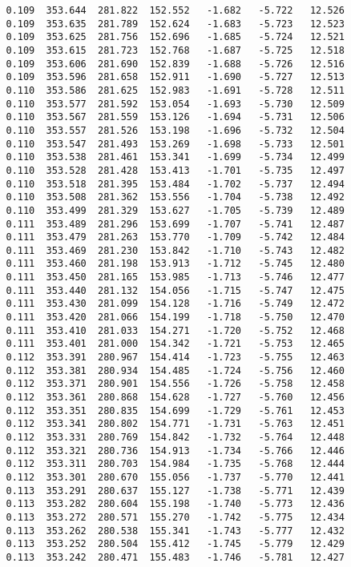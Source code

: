 \begin{verbatim}
   0.109  353.644  281.822  152.552   -1.682   -5.722   12.526
   0.109  353.635  281.789  152.624   -1.683   -5.723   12.523
   0.109  353.625  281.756  152.696   -1.685   -5.724   12.521
   0.109  353.615  281.723  152.768   -1.687   -5.725   12.518
   0.109  353.606  281.690  152.839   -1.688   -5.726   12.516
   0.109  353.596  281.658  152.911   -1.690   -5.727   12.513
   0.110  353.586  281.625  152.983   -1.691   -5.728   12.511
   0.110  353.577  281.592  153.054   -1.693   -5.730   12.509
   0.110  353.567  281.559  153.126   -1.694   -5.731   12.506
   0.110  353.557  281.526  153.198   -1.696   -5.732   12.504
   0.110  353.547  281.493  153.269   -1.698   -5.733   12.501
   0.110  353.538  281.461  153.341   -1.699   -5.734   12.499
   0.110  353.528  281.428  153.413   -1.701   -5.735   12.497
   0.110  353.518  281.395  153.484   -1.702   -5.737   12.494
   0.110  353.508  281.362  153.556   -1.704   -5.738   12.492
   0.110  353.499  281.329  153.627   -1.705   -5.739   12.489
   0.111  353.489  281.296  153.699   -1.707   -5.741   12.487
   0.111  353.479  281.263  153.770   -1.709   -5.742   12.484
   0.111  353.469  281.230  153.842   -1.710   -5.743   12.482
   0.111  353.460  281.198  153.913   -1.712   -5.745   12.480
   0.111  353.450  281.165  153.985   -1.713   -5.746   12.477
   0.111  353.440  281.132  154.056   -1.715   -5.747   12.475
   0.111  353.430  281.099  154.128   -1.716   -5.749   12.472
   0.111  353.420  281.066  154.199   -1.718   -5.750   12.470
   0.111  353.410  281.033  154.271   -1.720   -5.752   12.468
   0.111  353.401  281.000  154.342   -1.721   -5.753   12.465
   0.112  353.391  280.967  154.414   -1.723   -5.755   12.463
   0.112  353.381  280.934  154.485   -1.724   -5.756   12.460
   0.112  353.371  280.901  154.556   -1.726   -5.758   12.458
   0.112  353.361  280.868  154.628   -1.727   -5.760   12.456
   0.112  353.351  280.835  154.699   -1.729   -5.761   12.453
   0.112  353.341  280.802  154.771   -1.731   -5.763   12.451
   0.112  353.331  280.769  154.842   -1.732   -5.764   12.448
   0.112  353.321  280.736  154.913   -1.734   -5.766   12.446
   0.112  353.311  280.703  154.984   -1.735   -5.768   12.444
   0.112  353.301  280.670  155.056   -1.737   -5.770   12.441
   0.113  353.291  280.637  155.127   -1.738   -5.771   12.439
   0.113  353.282  280.604  155.198   -1.740   -5.773   12.436
   0.113  353.272  280.571  155.270   -1.742   -5.775   12.434
   0.113  353.262  280.538  155.341   -1.743   -5.777   12.432
   0.113  353.252  280.504  155.412   -1.745   -5.779   12.429
   0.113  353.242  280.471  155.483   -1.746   -5.781   12.427

\end{verbatim}
